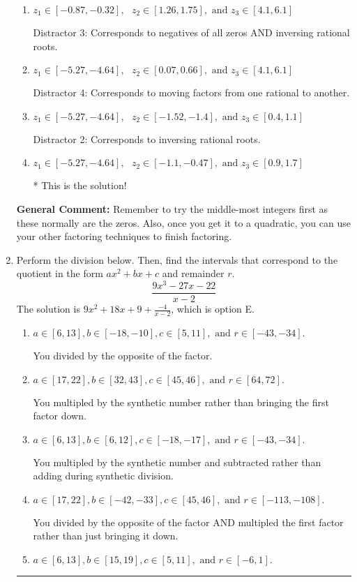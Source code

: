 \documentclass{extbook}[14pt]
\newcommand{\litem}[1]{\item #1

\rule{\textwidth}{0.4pt}}
\begin{document}
\begin{enumerate}
{\begin{enumerate}[label=\Alph*.]
 Distractor 1: Corresponds to negatives of all zeros.
\item \( z_1 \in [-0.87, -0.32], \text{   }  z_2 \in [1.26, 1.75], \text{   and   } z_3 \in [4.1, 6.1] \)

 Distractor 3: Corresponds to negatives of all zeros AND inversing rational roots.
\item \( z_1 \in [-5.27, -4.64], \text{   }  z_2 \in [0.07, 0.66], \text{   and   } z_3 \in [4.1, 6.1] \)

 Distractor 4: Corresponds to moving factors from one rational to another.
\item \( z_1 \in [-5.27, -4.64], \text{   }  z_2 \in [-1.52, -1.4], \text{   and   } z_3 \in [0.4, 1.1] \)

 Distractor 2: Corresponds to inversing rational roots.
\item \( z_1 \in [-5.27, -4.64], \text{   }  z_2 \in [-1.1, -0.47], \text{   and   } z_3 \in [0.9, 1.7] \)

* This is the solution!
\end{enumerate}

\textbf{General Comment:} Remember to try the middle-most integers first as these normally are the zeros. Also, once you get it to a quadratic, you can use your other factoring techniques to finish factoring.
}
\litem{
Perform the division below. Then, find the intervals that correspond to the quotient in the form $ax^2+bx+c$ and remainder $r$.
\[ \frac{9x^{3} -27 x -22}{x -2} \]The solution is \( 9x^{2} +18 x + 9 + \frac{-4}{x -2} \), which is option E.\begin{enumerate}[label=\Alph*.]
\item \( a \in [6, 13], b \in [-18, -10], c \in [5, 11], \text{ and } r \in [-43, -34]. \)

 You divided by the opposite of the factor.
\item \( a \in [17, 22], b \in [32, 43], c \in [45, 46], \text{ and } r \in [64, 72]. \)

 You multipled by the synthetic number rather than bringing the first factor down.
\item \( a \in [6, 13], b \in [6, 12], c \in [-18, -17], \text{ and } r \in [-43, -34]. \)

 You multipled by the synthetic number and subtracted rather than adding during synthetic division.
\item \( a \in [17, 22], b \in [-42, -33], c \in [45, 46], \text{ and } r \in [-113, -108]. \)

 You divided by the opposite of the factor AND multipled the first factor rather than just bringing it down.
\item \( a \in [6, 13], b \in [15, 19], c \in [5, 11], \text{ and } r \in [-6, 1]. \)


\end{enumerate}}
\end{enumerate}
\end{document}
